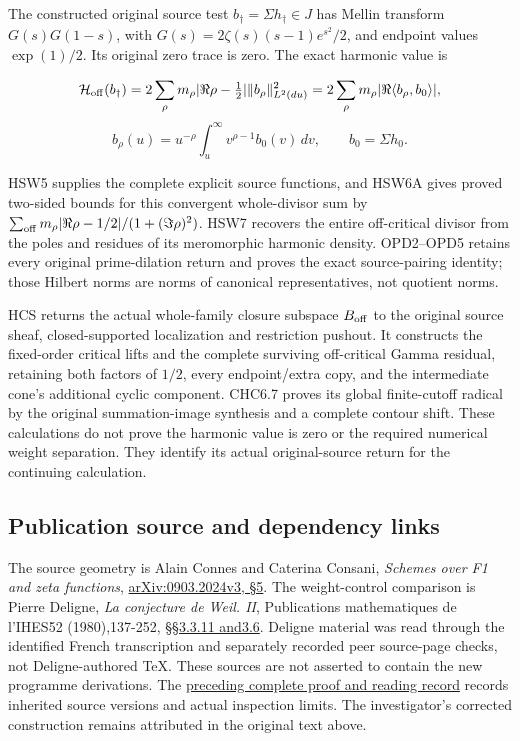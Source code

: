 The constructed original source test \(b_\dagger=\Sigma h_\dagger\in J\)
has Mellin transform \(G(s)G(1-s)\), with
\(G(s)=2\zeta(s)(s-1)e^{s^2}/2\), and endpoint values \(\exp(1)/2\). Its
original zero trace is zero. The exact harmonic value is

\[
\mathcal H_{\rm off}(b_\dagger)=2\sum_\rho m_\rho|\Re\rho-\tfrac12|\|b_\rho\|_{L^2(du)}^2
=2\sum_\rho m_\rho|\Re\langle b_\rho,b_0\rangle|,
\] \[
b_\rho(u)=u^{-\rho}\int_u^\infty v^{\rho-1}b_0(v)\,dv,\qquad b_0=\Sigma h_0.
\]

HSW5 supplies the complete explicit source functions, and HSW6A gives
proved two-sided bounds for this convergent whole-divisor sum by
\(\sum_{\rm off}m_\rho|\Re\rho-1/2|/(1+(\Im\rho)^2)\). HSW7 recovers the
entire off-critical divisor from the poles and residues of its
meromorphic harmonic density. OPD2--OPD5 retains every original
prime-dilation return and proves the exact source-pairing identity;
those Hilbert norms are norms of canonical representatives, not quotient
norms.

HCS returns the actual whole-family closure subspace \(B_{\rm off}\) to
the original source sheaf, closed-supported localization and restriction
pushout. It constructs the fixed-order critical lifts and the complete
surviving off-critical Gamma residual, retaining both factors of
\(1/2\), every endpoint/extra copy, and the intermediate cone's
additional cyclic component. CHC6.7 proves its global finite-cutoff
radical by the original summation-image synthesis and a complete contour
shift. These calculations do not prove the harmonic value is zero or the
required numerical weight separation. They identify its actual
original-source return for the continuing calculation.

\subsection{Publication source and dependency
links}\label{publication-source-and-dependency-links}

The source geometry is Alain Connes and Caterina Consani, \emph{Schemes
over F1 and zeta functions},
\href{https://arxiv.org/abs/0903.2024v3}{arXiv:0903.2024v3, §5}. The
weight-control comparison is Pierre Deligne, \emph{La conjecture de
Weil. II}, Publications mathematiques de l'IHES52 (1980),137-252,
\href{https://www.numdam.org/item/PMIHES_1980__52__137_0/}{§§3.3.11
and3.6}. Deligne material was read through the identified French
transcription and separately recorded peer source-page checks, not
Deligne-authored TeX. These sources are not asserted to contain the new
programme derivations. The
\href{https://github.com/KokunoYumeto/zeta-function-research-reader/blob/36a82ecca98addb8a98b48204e349737856c7223/workbenches/splitzero-tandem/continuations/20260924-cohomology-weight-and-character-lifts/BUILD_AND_REVIEW.md}{preceding
complete proof and reading record} records inherited source versions and
actual inspection limits. The investigator's corrected construction
remains attributed in the original text above.

